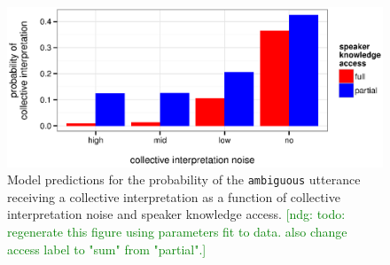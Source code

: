 \documentclass[linguex]{sp}
\newcommand{\ndg}[1]{\textcolor{Green}{[ndg: #1]}}
\begin{document}
\begin{figure}[h]
	\centering
	\includegraphics[width=\linewidth]{plots/model-results.eps}
	\vspace{-20pt}
	\caption{Model predictions for the probability of the \texttt{ambiguous} utterance receiving a collective interpretation as a function of collective interpretation noise and speaker knowledge access.  \ndg{todo: regenerate this figure using parameters fit to data. also change access label to "sum" from "partial".}  } \label{modelresults} 
\end{figure}


\end{document}
